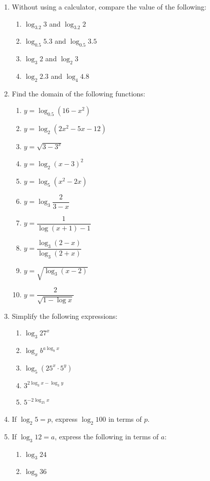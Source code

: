 \documentclass[12pt]{report}
\begin{document}
\begin{multicols}{2}
\begin{enumerate}
    \item Without using a calculator, compare the value of the following:
          \begin{enumerate}
            \item $\log_{3.2}3$ and $\log_{3.2}2$
            \item $\log_{0.5}5.3$ and $\log_{0.5}3.5$
            \item $\log_{3}2$ and $\log_{2}3$
            \item $\log_{2}2.3$ and $\log_{4}4.8$
          \end{enumerate}

    \item Find the domain of the following functions:
          \begin{enumerate}
            \item $y=\log_{0.5}\left(16-x^{2}\right)$
            \item $y=\log_{2}\left(2x^{2}-5x-12\right)$
            \item $y=\sqrt{3-3^{x}}$
            \item $y=\log_{2}{(x-3)}^{2}$
            \item $y=\log_{5}\left(x^{2}-2x\right)$
            \item $y=\log_{3}{\dfrac{2}{3-x}}$
            \item $y=\dfrac{1}{\log(x+1)-1}$
            \item $y=\dfrac{\log_3\left(2-x\right)}{\log_3\left(2+x\right)}$
            \item $y=\sqrt{\log_{3}(x-2)}$
            \item $y={\dfrac{2}{\sqrt{1-\log x}}}$
          \end{enumerate}

    \item Simplify the following expressions:
          \begin{enumerate}
            \item $\log_{3}27^{x}$
            \item $\log_{x}b^{a\log_{b}x}$
            \item $\log_{5}\left(25^{x}\cdot5^{y}\right)$
            \item $3^{2\log_{3}x - \log_{3}y}$
            \item $5^{-2\log_{25}x}$
          \end{enumerate}

    \item If $\log_2 5 = p$, express $\log_2 100$ in terms of $p$.
    \item If $\log_3 12 = a$, express the following in terms of $a$:
          \begin{enumerate}
            \item $\log_3 24$
            \item $\log_9 36$
          \end{enumerate}


\end{enumerate}
\end{multicols}
\end{document}
